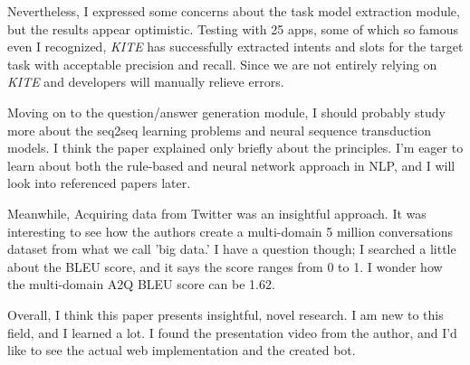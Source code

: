\documentclass[10pt,a4paper]{article}
\begin{document}
	Nevertheless, I expressed some concerns about the task model extraction module, but the results appear optimistic. Testing with 25 apps, some of which so famous even I recognized, \textit{KITE} has successfully extracted intents and slots for the target task with acceptable precision and recall. Since we are not entirely relying on \textit{KITE} and developers will manually relieve errors.
	
	Moving on to the question/answer generation module, I should probably study more about the seq2seq learning problems and neural sequence transduction models. I think the paper explained only briefly about the principles. I'm eager to learn about both the rule-based and neural network approach in NLP, and I will look into referenced papers later.
	
	Meanwhile, Acquiring data from Twitter was an insightful approach. It was interesting to see how the authors create a multi-domain 5 million conversations dataset from what we call 'big data.' I have a question though; I searched a little about the BLEU score, and it says the score ranges from 0 to 1. I wonder how the multi-domain A2Q BLEU score can be 1.62.
	
	Overall, I think this paper presents insightful, novel research. I am new to this field, and I learned a lot. I found the presentation video from the author, and I'd like to see the actual web implementation and the created bot. 
	
\end{document}
